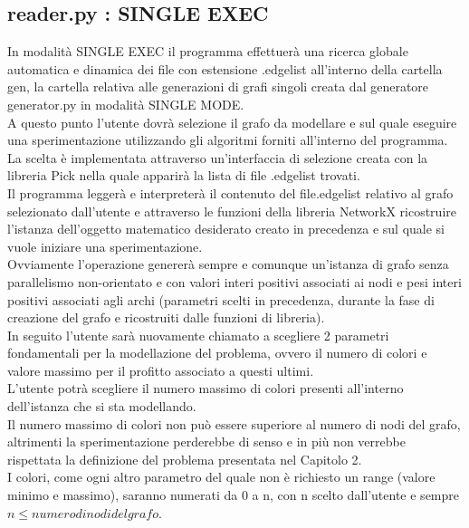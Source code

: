 \subsection{reader.py : SINGLE EXEC}
\justify
In modalità SINGLE EXEC il programma effettuerà una ricerca globale automatica e dinamica dei file con estensione .edgelist all'interno della cartella gen, la cartella relativa alle generazioni di grafi singoli creata dal generatore generator.py in modalità SINGLE MODE.\\

A questo punto l'utente dovrà selezione il grafo da modellare e sul quale eseguire una sperimentazione utilizzando gli algoritmi forniti all'interno del programma.\\
La scelta è implementata attraverso un'interfaccia di selezione creata con la libreria Pick nella quale apparirà la lista di file .edgelist trovati.\\

Il programma leggerà e interpreterà il contenuto del file.edgelist relativo al grafo selezionato dall'utente e attraverso le funzioni della libreria NetworkX ricostruire l'istanza dell'oggetto matematico desiderato creato in precedenza e sul quale si vuole iniziare una sperimentazione.\\

Ovviamente l'operazione genererà sempre e comunque un'istanza di grafo senza parallelismo non-orientato e con valori interi positivi associati ai nodi e pesi interi positivi associati agli archi (parametri scelti in precedenza, durante la fase di creazione del grafo e ricostruiti dalle funzioni di libreria).\\

In seguito l'utente sarà nuovamente chiamato a scegliere 2 parametri fondamentali per la modellazione del problema, ovvero il numero di colori e valore massimo per il profitto associato a questi ultimi.\\

L'utente potrà scegliere il numero massimo di colori presenti all'interno dell'istanza che si sta modellando.\\
Il numero massimo di colori non può essere superiore al numero di nodi del grafo, altrimenti la sperimentazione perderebbe di senso e in più non verrebbe rispettata la definizione del problema presentata nel Capitolo 2.\\
I colori, come ogni altro parametro del quale non è richiesto un range (valore minimo e massimo), saranno numerati da 0 a n, con n scelto dall'utente e sempre \(n \leq numero di nodi del grafo\).\\

